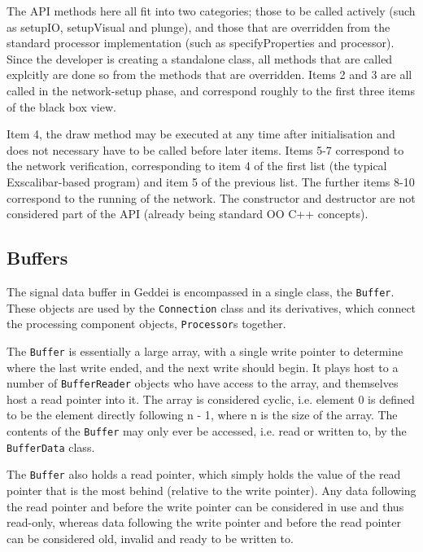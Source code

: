 The API methods here all fit into two categories; those to be called actively (such as setupIO, setupVisual and plunge), and those that are overridden from the standard processor implementation (such as specifyProperties and processor). Since the developer is creating a standalone class, all methods that are called explcitly are done so from the methods that are overridden. Items 2 and 3 are all called in the network-setup phase, and correspond roughly to the first three items of the black box view.

Item 4, the draw method may be executed at any time after initialisation and does not necessary have to be called before later items. Items 5-7 correspond to the network verification, corresponding to item 4 of the first list (the typical Exscalibar-based program) and item 5 of the previous list. The further items 8-10 correspond to the running of the network. The constructor and destructor are not considered part of the API (already being standard OO C++ concepts).


\subsection{Buffers}\label{sec:buffers}

The signal data buffer in Geddei is encompassed in a single class, the \texttt{Buffer}. These objects are used by the \texttt{Connection} class and its derivatives, which connect the processing component objects, \texttt{Processor}s together.

The \texttt{Buffer} is essentially a large array, with a single  write pointer to determine where the last write ended, and the next write should begin. It plays host to a number of \texttt{BufferReader} objects who have access to the array, and themselves host a read pointer into it. The array is considered cyclic, i.e. element 0 is defined to be the element directly following {n - 1}, where {n} is the size of the array. The contents of the \texttt{Buffer} may only ever be accessed, i.e. read or written to, by the \texttt{BufferData} class.

The \texttt{Buffer} also holds a read pointer, which simply holds the value of the read pointer that is the most behind (relative to the write pointer). Any data following the read pointer and before the write pointer can be considered in use and thus read-only, whereas data following the write pointer and before the read pointer can be considered old, invalid and ready to be written to.

